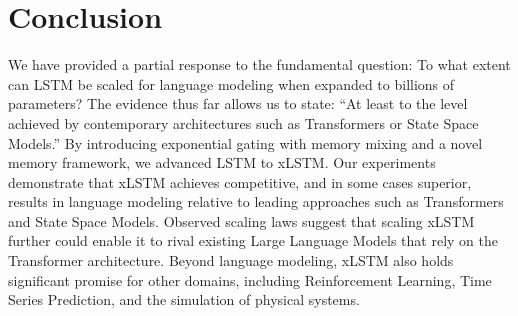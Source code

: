 \section{Conclusion}
We have provided a partial response to the fundamental question: To what extent can LSTM be scaled for language modeling when expanded to billions of parameters? The evidence thus far allows us to state: ``At least to the level achieved by contemporary architectures such as Transformers or State Space Models.'' By introducing exponential gating with memory mixing and a novel memory framework, we advanced LSTM to xLSTM. Our experiments demonstrate that xLSTM achieves competitive, and in some cases superior, results in language modeling relative to leading approaches such as Transformers and State Space Models. Observed scaling laws suggest that scaling xLSTM further could enable it to rival existing Large Language Models that rely on the Transformer architecture. Beyond language modeling, xLSTM also holds significant promise for other domains, including Reinforcement Learning, Time Series Prediction, and the simulation of physical systems.

